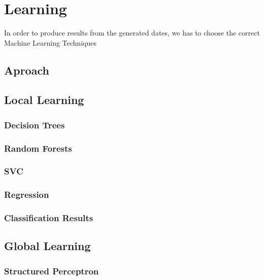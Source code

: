 \documentclass[bsc,frontabs,twoside,singlespacing,parskip,deptreport]{infthesis}     %
\begin{document}

\chapter{Learning}
In order to produce results from the generated dates,
we has to choose the correct Machine Learning Techniques
\section{Aproach}

\section{Local Learning}
\subsection{Decision Trees}
\subsection{Random Forests}
\subsection{SVC}
\subsection{Regression}
\subsection{Classification Results}

\section{Global Learning}
\subsection{Structured Perceptron}
\end{document}
